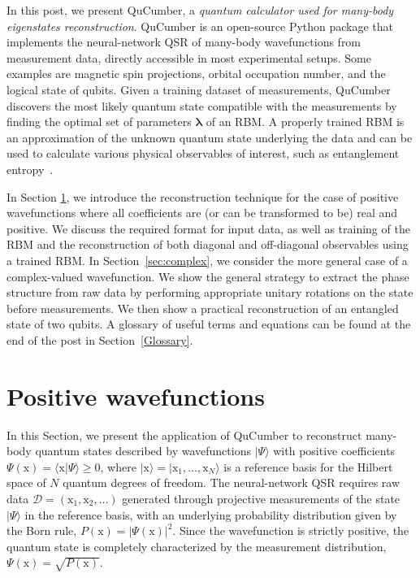 \documentclass[submission, Phys, hidelnks]{SciPost}
\begin{document}
In this post, we present QuCumber, a {\it quantum calculator used for many-body eigenstates reconstruction}. QuCumber is an open-source Python package that implements the neural-network QSR of many-body wavefunctions from measurement data, directly accessible in most experimental setups. Some examples are magnetic spin projections, orbital occupation number, and the logical state of qubits. Given a training dataset of measurements, QuCumber discovers the most likely quantum state compatible with the measurements by finding the optimal set of parameters $\bm{\lambda}$ of an RBM. A properly trained RBM is an approximation of the unknown quantum state underlying the data and can be used to calculate various physical observables of interest, such as entanglement entropy~\cite{torlai2018tomography}.

In Section \ref{sec:positive}, we introduce the reconstruction technique for the case of positive wavefunctions where all coefficients are (or can be transformed to be) real and positive. We discuss the required format for input data, as well as training of the RBM and the reconstruction of both diagonal and off-diagonal observables using a trained RBM. In Section~\ref{sec:complex}, we consider the more general case of a complex-valued wavefunction. We show the general strategy to extract the phase structure from raw data by performing appropriate unitary rotations on the state before measurements. We then show a practical reconstruction of an entangled state of two qubits. A glossary of useful terms and equations can be found at the end of the post in Section~\ref{Glossary}.

\section{Positive wavefunctions}\label{sec:positive}
In this Section, we present the application of QuCumber to reconstruct many-body quantum states described by wavefunctions $|\Psi\rangle$ with positive coefficients $\Psi(\bm{\mathrm{x}})=\langle\bm{\mathrm{x}}|\Psi\rangle \ge0$, where $|\bm{\mathrm{x}}\rangle=|\mathrm{x}_1,\dots,\mathrm{x}_N\rangle$ is a reference basis for the Hilbert space of $N$ quantum degrees of freedom. The neural-network QSR requires raw data $\mathcal{D}=(\bm{\mathrm{x}}_1,\bm{\mathrm{x}}_2,\dots)$ generated through projective measurements of the state $|\Psi\rangle$ in the reference basis, with an underlying probability distribution given by the Born rule, $P(\bm{\mathrm{x}})=|\Psi(\bm{\mathrm{x}})|^2$. Since the wavefunction is strictly positive, the quantum state is completely characterized by the measurement distribution, $\Psi(\bm{\mathrm{x}})=\sqrt{P(\bm{\mathrm{x}})}$. 
\end{document}
